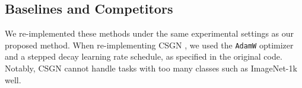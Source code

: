 \subsection{Baselines and Competitors}

We re-implemented these methods under the same experimental settings as our proposed method. When re-implementing CSGN \cite{linlearning}, we used the \texttt{AdamW} optimizer and a stepped decay learning rate schedule, as specified in the original code. Notably, CSGN \cite{linlearning} cannot handle tasks with too many classes such as ImageNet-1k well.

\clearpage

